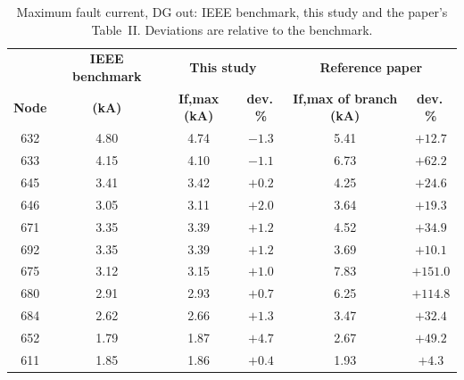 \documentclass[12pt,a4paper]{article}
\begin{document}
\begin{table}[H]
\centering\small
\begin{tabular}{|c|c|c|c|c|c|}
\hline
 & \textbf{IEEE benchmark} & \multicolumn{2}{c|}{\textbf{This study}} & \multicolumn{2}{c|}{\textbf{Reference paper}} \\
\textbf{Node} & \textbf{(kA)} & \textbf{If,max (kA)} & \textbf{dev.\,\%} & \textbf{If,max of branch (kA)} & \textbf{dev.\,\%} \\ \hline
632 & 4.80 & 4.74 & $-1.3$ & 5.41 & $+12.7$ \\ \hline
633 & 4.15 & 4.10 & $-1.1$ & 6.73 & $+62.2$ \\ \hline
645 & 3.41 & 3.42 & $+0.2$ & 4.25 & $+24.6$ \\ \hline
646 & 3.05 & 3.11 & $+2.0$ & 3.64 & $+19.3$ \\ \hline
671 & 3.35 & 3.39 & $+1.2$ & 4.52 & $+34.9$ \\ \hline
692 & 3.35 & 3.39 & $+1.2$ & 3.69 & $+10.1$ \\ \hline
675 & 3.12 & 3.15 & $+1.0$ & 7.83 & $+151.0$ \\ \hline
680 & 2.91 & 2.93 & $+0.7$ & 6.25 & $+114.8$ \\ \hline
684 & 2.62 & 2.66 & $+1.3$ & 3.47 & $+32.4$ \\ \hline
652 & 1.79 & 1.87 & $+4.7$ & 2.67 & $+49.2$ \\ \hline
611 & 1.85 & 1.86 & $+0.4$ & 1.93 & $+4.3$ \\ \hline
\end{tabular}
\caption{Maximum fault current, DG out: IEEE benchmark, this study and the paper's Table~II. Deviations are
relative to the benchmark.}
\label{tab:bench}
\end{table}
\end{document}
